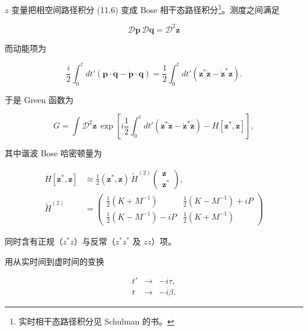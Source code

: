$z$ 变量把相空间路径积分 (11.6) 变成 Bose 相干态路径积分\footnote{实时相干态路径积分见 Schulman 的书。}。测度之间满足

\begin{equation*}
\mathcal {D} \mathbf {p} \, \mathcal {D} \mathbf {q} = \mathcal {D} ^ {2} \mathbf {z}
\tag{11.17}
\end{equation*}

而动能项为

\begin{equation*}
\frac {i}{2} \int_ {0} ^ {t} d t ' \left( \mathbf {p} \cdot \dot {\mathbf {q}} - \dot {\mathbf {p}} \cdot \mathbf {q} \right) = \frac {1}{2} \int_ {0} ^ {t} d t ' \left( \mathbf {z} ^ {*} \dot {\mathbf {z}} - \dot {\mathbf {z}} ^ {*} \mathbf {z} \right).
\tag{11.18}
\end{equation*}

于是 Green 函数为

\begin{equation*}
G = \int \mathcal {D} ^ {2} \mathbf {z} \, \exp \left[ i \frac {1}{2} \int_ {0} ^ {t} d t ' \left( \mathbf {z} ^ {*} \dot {\mathbf {z}} - \dot {\mathbf {z}} ^ {*} \mathbf {z} \right) - H [ \mathbf {z} ^ {*}, \mathbf {z} ] \right] ,
\tag{11.19}
\end{equation*}

其中谐波 Bose 哈密顿量为

\begin{align*}
H [ \mathbf {z} ^ {*}, \mathbf {z} ] & \approx \frac {1}{2} ( \mathbf {z} ^ {*}, \mathbf {z} ) \, \tilde {H} ^ {(2)} \left( \begin{array}{l} \mathbf {z} \\ \mathbf {z} ^ {*} \end{array} \right) ,\\
\tilde {H} ^ {(2)} & = \left( \begin{array}{cc} \frac {1}{2} ( K + M ^ {- 1} ) & \frac {1}{2} ( K - M ^ {- 1} ) + iP \\ \frac {1}{2} ( K - M ^ {- 1} ) - iP & \frac {1}{2} ( K + M ^ {- 1} ) \end{array} \right)
\tag{11.20}
\end{align*}

同时含有正规（$z^{*}z$）与反常（$z^{*}z^{*}$ 及 $zz$）项。

用从实时间到虚时间的变换

\begin{equation*}
\begin{array}{ccc}
t ' & \rightarrow & - i \tau ,\\
t & \rightarrow & - i \beta .
\end{array}
\tag{11.21}
\end{equation*}


